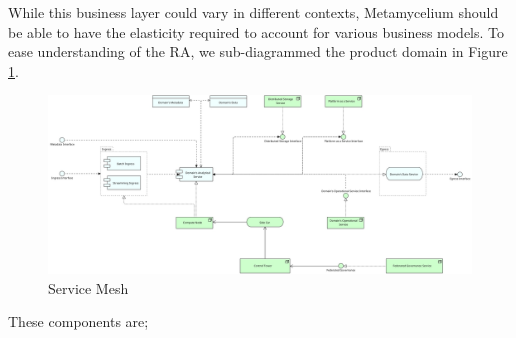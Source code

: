 \documentclass[journal]{IEEEtran}
\begin{document}
While this business layer could vary in different contexts, Metamycelium should be able to have the elasticity required to account for various business models. To ease understanding of the RA, we sub-diagrammed the product domain in Figure \ref{fig:MetamyceliumServiceMesh}.

\begin{figure}
  \centering
  \includegraphics[width=\textwidth]{images/metamyceliumServiceMesh.jpg}
  \caption{Service Mesh}
  \label{fig:MetamyceliumServiceMesh}
\end{figure}

These components are;
\end{document}
